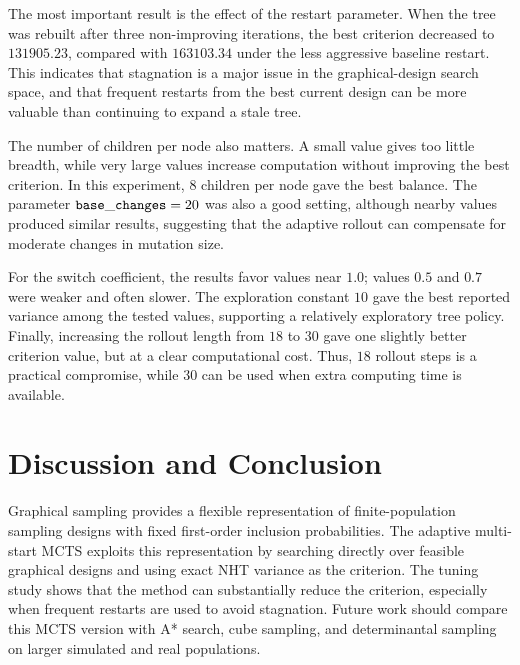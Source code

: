 \documentclass[twoside]{article}
\begin{document}
The most important result is the effect of the restart parameter. When the
tree was rebuilt after three non-improving iterations, the best criterion
decreased to $131905.23$, compared with $163103.34$ under the less aggressive
baseline restart. This indicates that stagnation is a major issue in the
graphical-design search space, and that frequent restarts from the best
current design can be more valuable than continuing to expand a stale tree.

The number of children per node also matters. A small value gives too little
breadth, while very large values increase computation without improving the
best criterion. In this experiment, $8$ children per node gave the best
balance. The parameter ${\tt base\_changes}=20$ was also a good setting,
although nearby values produced similar results, suggesting that the adaptive
rollout can compensate for moderate changes in mutation size.

For the switch coefficient, the results favor values near $1.0$; values
$0.5$ and $0.7$ were weaker and often slower. The exploration constant $10$
gave the best reported variance among the tested values, supporting a
relatively exploratory tree policy. Finally, increasing the rollout length
from $18$ to $30$ gave one slightly better criterion value, but at a clear
computational cost. Thus, $18$ rollout steps is a practical compromise, while
$30$ can be used when extra computing time is available.

\section*{Discussion and Conclusion}

Graphical sampling provides a flexible representation of finite-population
sampling designs with fixed first-order inclusion probabilities. The adaptive
multi-start MCTS exploits this representation by searching directly over
feasible graphical designs and using exact NHT variance as the criterion.
The tuning study shows that the method can substantially reduce the criterion,
especially when frequent restarts are used to avoid stagnation. Future work
should compare this MCTS version with A* search, cube sampling, and
determinantal sampling on larger simulated and real populations.
\end{document}
